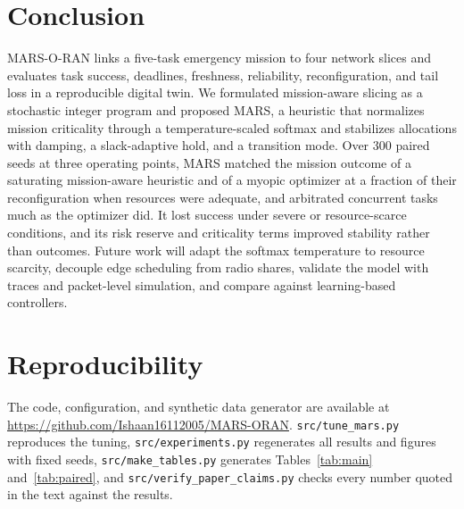 \documentclass[conference]{IEEEtran}
\begin{document}
\section{Conclusion}
MARS-O-RAN links a five-task emergency mission to four network slices and evaluates task success, deadlines, freshness, reliability, reconfiguration, and tail loss in a reproducible digital twin. We formulated mission-aware slicing as a stochastic integer program and proposed MARS, a heuristic that normalizes mission criticality through a temperature-scaled softmax and stabilizes allocations with damping, a slack-adaptive hold, and a transition mode. Over 300 paired seeds at three operating points, MARS matched the mission outcome of a saturating mission-aware heuristic and of a myopic optimizer at a fraction of their reconfiguration when resources were adequate, and arbitrated concurrent tasks much as the optimizer did. It lost success under severe or resource-scarce conditions, and its risk reserve and criticality terms improved stability rather than outcomes. Future work will adapt the softmax temperature to resource scarcity, decouple edge scheduling from radio shares, validate the model with traces and packet-level simulation, and compare against learning-based controllers.

\section*{Reproducibility}
The code, configuration, and synthetic data generator are available at \url{https://github.com/Ishaan16112005/MARS-ORAN}. \texttt{src/tune\_mars.py} reproduces the tuning, \texttt{src/experiments.py} regenerates all results and figures with fixed seeds, \texttt{src/make\_tables.py} generates Tables~\ref{tab:main} and~\ref{tab:paired}, and \texttt{src/verify\_paper\_claims.py} checks every number quoted in the text against the results.
\end{document}

